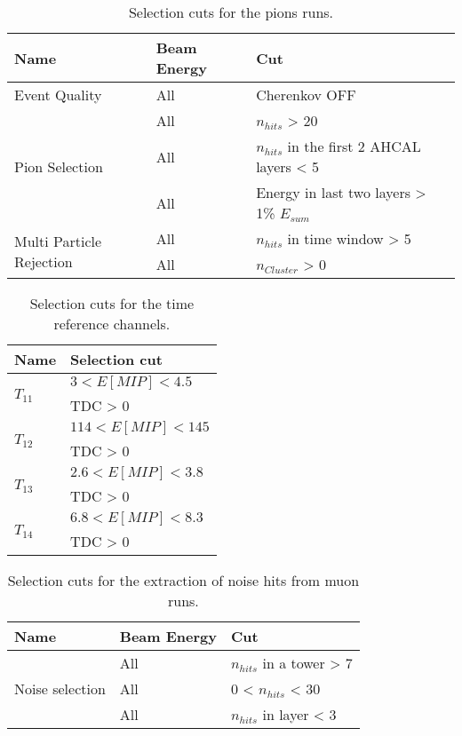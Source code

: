 \begin{table}[htb!]
	\centering
	\caption{Selection cuts for the pions runs.}
	\label{table:pion_sel}
	\begin{tabular}{@{}lll@{}}
		\toprule
		\multicolumn{1}{l}{\textbf{Name}} & \textbf{Beam Energy} & \textbf{Cut}\\
		\midrule
		\multirow{1}{*}{Event Quality}& All & Cherenkov OFF\\
		\midrule
		\multirow{3}{*}{Pion Selection}& All & $n_{hits}$ > 20 \\& All & $n_{hits}$ in the first 2 AHCAL layers < 5 \\& All & Energy in last two layers > 1\% $E_{sum}$ \\
		\midrule
		\multirow{2}{*}{Multi Particle Rejection}& All & $n_{hits}$ in time window > 5 \\& All & $n_{Cluster}$ > 0 \\
		\bottomrule
	\end{tabular}
\end{table}

\begin{table}[htb!]
	\centering
	\caption{Selection cuts for the time reference channels.}
	\label{table:T0_sel}
	\begin{tabular}{@{}ll@{}}
		\toprule
		\multicolumn{1}{l}{\textbf{Name}} & \textbf{Selection cut}\\
		\midrule
		\multirow{2}{*}{$T_{11}$}& $3 < E [MIP] < 4.5$\\ & TDC > 0 \\
		\multirow{2}{*}{$T_{12}$}& $114 < E [MIP] < 145$\\ & TDC > 0 \\
		\multirow{2}{*}{$T_{13}$}& $2.6 < E [MIP] < 3.8$\\ & TDC > 0 \\
		\multirow{2}{*}{$T_{14}$}& $6.8 < E [MIP] < 8.3$\\ & TDC > 0 \\
		\bottomrule
	\end{tabular}
\end{table}

\begin{table}[htb!]
	\centering
	\caption{Selection cuts for the extraction of noise hits from muon runs.}
	\label{table:noise_sel}
	\begin{tabular}{@{} lll @{}}
		\toprule
		\multicolumn{1}{l}{\textbf{Name}} & \textbf{Beam Energy} & \textbf{Cut}\\
		\midrule
		\multirow{3}{*}{Noise selection}& All & $n_{hits}$ in a tower > 7\\& All & 0 < $n_{hits}$ < 30\\& All & $n_{hits}$ in layer < 3\\
		\bottomrule
	\end{tabular}
\end{table}
